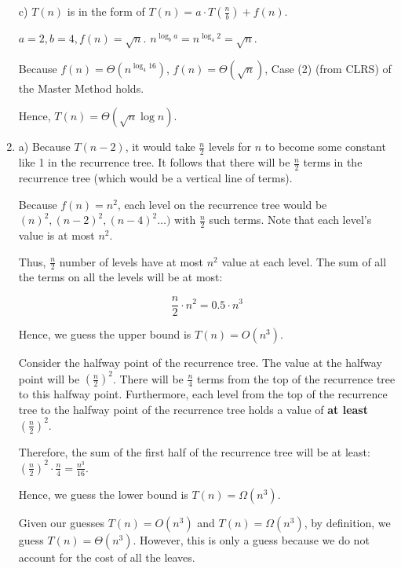 \documentclass[a4paper]{report}
\begin{document}
\begin{enumerate}

      \bigskip
      c) 
      $T(n)$ is in the form of $T(n) = a \cdot T(\frac{n}{b}) + f(n)$.
      
      $a = 2, b = 4, f(n) = \sqrt{n}$. $n^{\log_b a} = n^{\log_4 2} = \sqrt{n}$. 

      Because $f(n) = \Theta(n^{\log_4 16})$, $f(n) = \Theta(\sqrt{n})$, Case (2) (from CLRS) of the Master Method holds. 

      Hence, $T(n) = \Theta(\sqrt{n} \log n)$. 

    \par
    \bigskip

    \item

      a) Because $T(n-2)$, it would take $\frac{n}{2}$ levels for $n$ to become some constant like 1 in the recurrence tree. 
      It follows that there will be $\frac{n}{2}$ terms in the recurrence tree (which would be a vertical line of terms). 

      Because $f(n) = n^2$, each level on the recurrence tree would be $(n)^2, (n-2)^2, (n-4)^2\dots)$ with $\frac{n}{2}$ such terms.
      Note that each level's value is at most $n^2$. 

      Thus, $\frac{n}{2}$ number of levels have at most $n^2$ value at each level. 
      The sum of all the terms on all the levels will be at most:

      $$\frac{n}{2} \cdot n^2 = 0.5 \cdot n^3$$

      Hence, we guess the upper bound is $T(n) = O(n^3)$. 

      Consider the halfway point of the recurrence tree. The value at the halfway point will be $(\frac{n}{2})^2$. There will be
      $\frac{n}{4}$ terms from the top of the recurrence tree to this halfway point. Furthermore, each level from the top of the
      recurrence tree to the halfway point of the recurrence tree holds a value of {\bf at least} $(\frac{n}{2})^2$.

      Therefore, the sum of the first half of the recurrence tree will be at least: $(\frac{n}{2})^2 \cdot \frac{n}{4} = \frac{n^{3}}{16}$.

      Hence, we guess the lower bound is $T(n) = \Omega(n^3)$.

      Given our guesses $T(n) = O(n^3)$ and $T(n) = \Omega(n^3)$, by definition, we guess $T(n) = \Theta(n^3)$.
      However, this is only a guess because we do not account for the cost of all the leaves. 
    


\end{enumerate}
\end{document}

